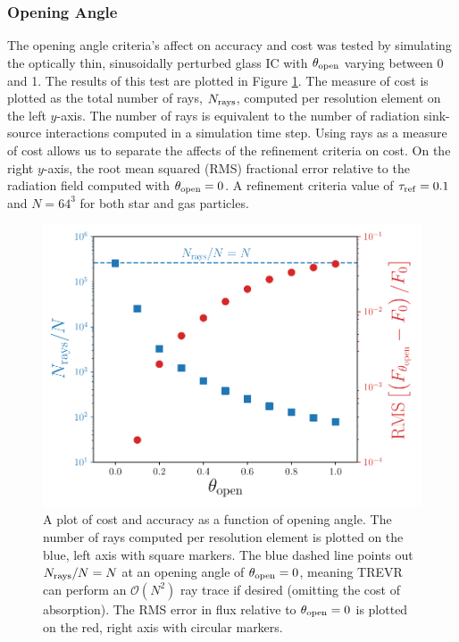 \documentclass[fleq,usenatbib]{mnras}
\newcommand{\acro}{TREVR}
\newcommand{\bigO}[1]{\mathcal{O}\left(#1\right)}
\newcommand{\tr}{\tau_{\rm ref}}
\newcommand{\tO}{\theta_{\rm open}}
\begin{document}
\subsubsection{Opening Angle}
The opening angle criteria's affect on accuracy and cost was tested by 
simulating the optically thin, sinusoidally perturbed glass IC with $\tO$ 
varying between 0 and 1. The results of this test are plotted in Figure 
\ref{fig:openangle}. The measure of cost is plotted as the total number of 
rays, $N_{\rm rays}$, computed per resolution element on the left $y$-axis. 
The number of rays is equivalent to the number of radiation sink-source 
interactions computed in a simulation time step. Using rays as a measure of 
cost allows us to separate the affects of the refinement criteria on cost. On 
the right $y$-axis, the root mean squared (RMS) fractional error relative to 
the radiation field computed with $\tO=0$. A refinement criteria 
value of $\tr = 0.1$ and $N=64^3$ for both star and gas particles.
\begin{figure}
\includegraphics[width=1\linewidth]{Figures/opening_angle.pdf}
\caption{A plot of cost and accuracy as a function of opening angle. The 
number of rays computed per resolution element is plotted on the blue, 
left axis with square markers. The blue dashed line points out 
$N_{\rm rays}/N = N$ at an opening angle of $\theta_{\rm open}=0$, meaning 
\acro{} can perform an $\bigO{N^2}$ ray trace if desired (omitting the cost of 
absorption). The RMS error in flux relative to $\theta_{\rm open}
=0$ is plotted on the red, right axis with circular markers.}
\label{fig:openangle}
\end{figure}
\end{document}

